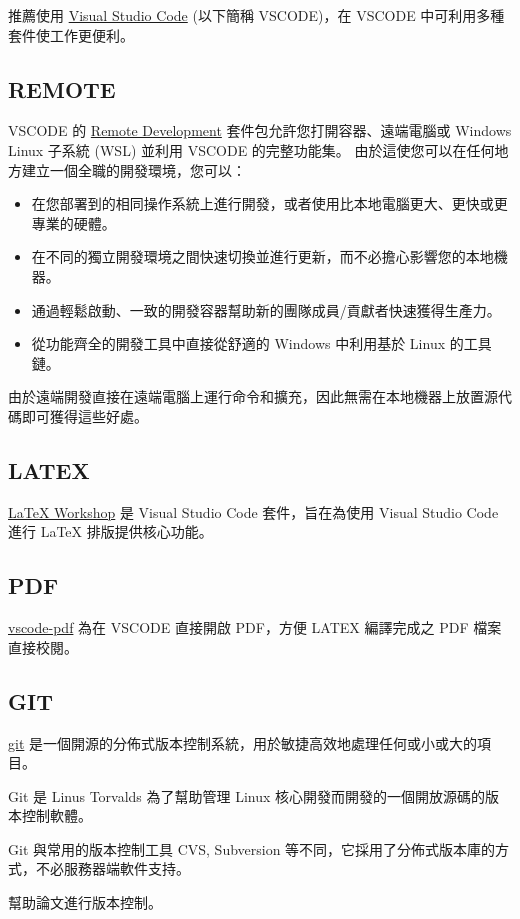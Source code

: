 推薦使用 \href{https://code.visualstudio.com/}{Visual Studio Code} (以下簡稱 VSCODE)，在 VSCODE 中可利用多種套件使工作更便利。

\subsection{REMOTE}

VSCODE 的 \href{https://marketplace.visualstudio.com/items?itemName=ms-vscode-remote.vscode-remote-extensionpack}{Remote Development} 套件包允許您打開容器、遠端電腦或 Windows Linux 子系統 (WSL) 並利用 VSCODE 的完整功能集。 由於這使您可以在任何地方建立一個全職的開發環境，您可以：

\begin{itemize}
    \item    在您部署到的相同操作系統上進行開發，或者使用比本地電腦更大、更快或更專業的硬體。
    \item    在不同的獨立開發環境之間快速切換並進行更新，而不必擔心影響您的本地機器。
    \item    通過輕鬆啟動、一致的開發容器幫助新的團隊成員/貢獻者快速獲得生產力。
    \item    從功能齊全的開發工具中直接從舒適的 Windows 中利用基於 Linux 的工具鏈。
\end{itemize}

由於遠端開發直接在遠端電腦上運行命令和擴充，因此無需在本地機器上放置源代碼即可獲得這些好處。 


\subsection{LATEX}
\href{https://marketplace.visualstudio.com/items?itemName=James-Yu.latex-workshop}{LaTeX Workshop} 是 Visual Studio Code 套件，旨在為使用 Visual Studio Code 進行 LaTeX 排版提供核心功能。 

\subsection{PDF}

\href{https://marketplace.visualstudio.com/items?itemName=tomoki1207.pdf}{vscode-pdf} 為在 VSCODE 直接開啟 PDF，方便 LATEX 編譯完成之 PDF 檔案直接校閱。

\subsection{GIT}

\href{https://git-scm.com/}{git} 是一個開源的分佈式版本控制系統，用於敏捷高效地處理任何或小或大的項目。

Git 是 Linus Torvalds 為了幫助管理 Linux 核心開發而開發的一個開放源碼的版本控制軟體。

Git 與常用的版本控制工具 CVS, Subversion 等不同，它採用了分佈式版本庫的方式，不必服務器端軟件支持。

幫助論文進行版本控制。